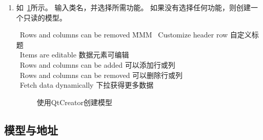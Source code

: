 \begin{enumerate}
\item 如\figurename\ \ref{p000046}所示。
输入类名，并选择所需功能。
如果没有选择任何功能，则创建一个只读的模型。
\begin{tabbing}
\textbullet\ Rows and columns can be removed \hspace{2em} \= MMM \kill
\textbullet\ Customize header row\>
自定义标题 \\
\textbullet\ Items are editable \>
数据元素可编辑 \\
\textbullet\ Rows and columns can be added \>
可以添加行或列 \\
\textbullet\ Rows and columns can be removed \>
可以删除行或列 \\
\textbullet\ Fetch data dynamically \>
下拉获得更多数据  
\end{tabbing}

\FloatBarrier
\begin{figure}[htb] %
\marginnote{\setlength\fboxsep{2pt}\fbox{\footnotesize{\kaishu\figurename\,}\footnotesize{\ref{p000046}}}}\centering %
\setlength\fboxsep{0pt} %
\caption{使用QtCreator创建模型} %
\label{p000046} %
\end{figure}


\end{enumerate}

\FloatBarrier
\subsection{
模型与地址
}\label{c000019s01s03}


